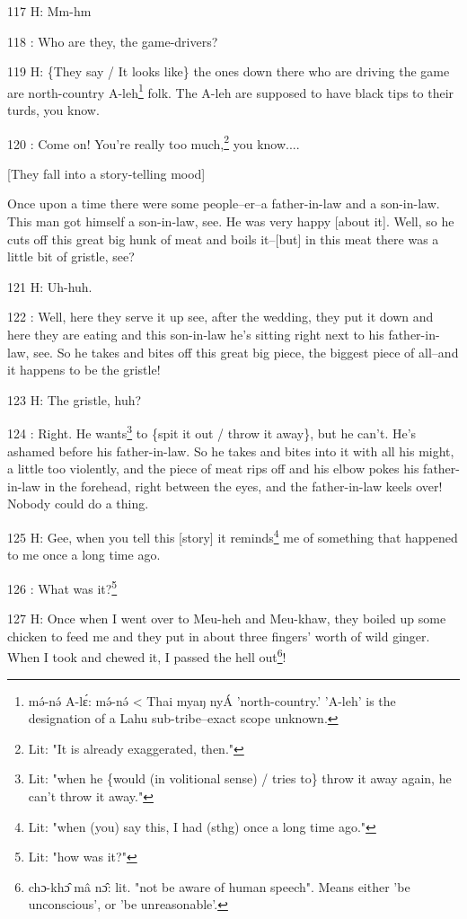 117 H: Mm-hm

118  : Who are they, the game-drivers?

119 H: \{They say / It looks like\} the ones down there who are driving the game
are north-country A-leh\footnote{mə́-nə́ A-lɛ́: mə́-nə́ < Thai myaŋ nyÁ 'north-country.' 'A-leh' is the designation of a Lahu sub-tribe--exact scope unknown.} folk. The A-leh are supposed to have black tips to
their turds, you know.

120  : Come on! You're really too much,\footnote{Lit: "It is already exaggerated, then."} you know....

[They fall into a story-telling mood]

Once upon a time there were some people--er--a father-in-law and a son-in-law.
This man got himself a son-in-law, see. He was very happy [about it]. Well, so
he cuts off this great big hunk of meat and boils it--[but] in this meat there
was a little bit of gristle, see?

121 H: Uh-huh.

122  : Well, here they serve it up see, after the wedding, they put it down and
here they are eating and this son-in-law he's sitting right next to his father-in-law,
see. So he takes and bites off this great big piece, the biggest piece of all--and
it happens to be the gristle!

123 H: The gristle, huh?

124  : Right. He wants\footnote{Lit: "when he \{would (in volitional sense) / tries to\} throw it away again, he can't throw it away."} to \{spit it out / throw it away\}, but he can't. He's
ashamed before his father-in-law. So he takes and bites into it with all his might,
a little too violently, and the piece of meat rips off and his elbow pokes his
father-in-law in the forehead, right between the eyes, and the father-in-law keels
over! Nobody could do a thing.

125 H: Gee, when you tell this [story] it reminds\footnote{Lit: "when (you) say this, I had (sthg) once a long time ago."} me of something that happened
to me once a long time ago.

126  : What was it?\footnote{Lit: "how was it?"}

127 H: Once when I went over to Meu-heh and Meu-khaw, they boiled up some chicken
to feed me and they put in about three fingers' worth of wild ginger. When I took
and chewed it, I passed the hell out\footnote{chɔ-khɔ̂ mâ nɔ̂: lit. "not be aware of human speech". Means either 'be unconscious', or 'be unreasonable'.}!

